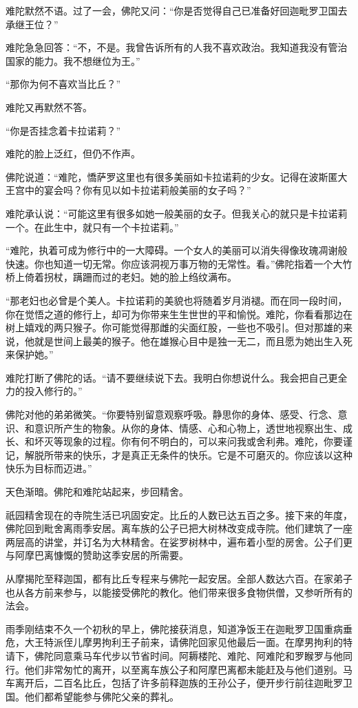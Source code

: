\documentclass[12pt,twoside,openany]{book}
\begin{document}
难陀默然不语。过了一会，佛陀又问：“你是否觉得自己已准备好回迦毗罗卫国去承继王位？”

难陀急急回答：“不，不是。我曾告诉所有的人我不喜欢政治。我知道我没有管治国家的能力。我不想继位为王。”

“那你为何不喜欢当比丘？”

难陀又再默然不答。

“你是否挂念着卡拉诺莉？”

难陀的脸上泛红，但仍不作声。

佛陀说道：“难陀，憍萨罗这里也有很多美丽如卡拉诺莉的少女。记得在波斯匿大王宫中的宴会吗？你有见以如卡拉诺莉般美丽的女子吗？”

难陀承认说：“可能这里有很多如她一般美丽的女子。但我关心的就只是卡拉诺莉一个。在此生中，就只有一个卡拉诺莉。”

“难陀，执着可成为修行中的一大障碍。一个女人的美丽可以消失得像玫瑰凋谢般快速。你也知道一切无常。你应该洞视万事万物的无常性。看。”佛陀指着一个大竹桥上倚着拐杖，蹒跚而过的老妇。她的脸上绉纹满布。

“那老妇也必曾是个美人。卡拉诺莉的美貌也将随着岁月消褪。而在同一段时间，你在觉悟之道的修行上，却可为你带来生生世世的平和愉悦。难陀，你看看那边在树上嬉戏的两只猴子。你可能觉得那雌的尖面红股，一些也不吸引。但对那雄的来说，他就是世间上最美的猴子。他在雄猴心目中是独一无二，而且愿为她出生入死来保护她。”

难陀打断了佛陀的话。“请不要继续说下去。我明白你想说什么。我会把自己更全力的投入修行的。”

佛陀对他的弟弟微笑。“你要特别留意观察呼吸。静思你的身体、感受、行念、意识、和意识所产生的物象。从你的身体、情感、心和心物上，透世地视察出生、成长、和坏灭等现象的过程。你有何不明白的，可以来问我或舍利弗。难陀，你要谨记，解脱所带来的快乐，才是真正无条件的快乐。它是不可磨灭的。你应该以这种快乐为目标而迈进。”

天色渐暗。佛陀和难陀站起来，步回精舍。

祇园精舍现在的寺院生活已巩固安定。比丘的人数已达五百之多。接下来的年度，佛陀回到毗舍离雨季安居。离车族的公子已把大树林改变成寺院。他们建筑了一座两层高的讲堂，并订名为大林精舍。在娑罗树林中，遍布着小型的房舍。公子们更与阿摩巴离慷慨的赞助这季安居的所需要。

从摩揭陀至释迦国，都有比丘专程来与佛陀一起安居。全部人数达六百。在家弟子也从各方前来参与，以能接受佛陀的教化。他们带来很多食物供僧，又参听所有的法会。

雨季刚结束不久一个初秋的早上，佛陀接获消息，知道净饭王在迦毗罗卫国重病垂危，大王特派侄儿摩男拘利王子前来，请佛陀回家见他最后一面。在摩男拘利的特请下，佛陀同意乘马车代步以节省时间。阿耨楼陀、难陀、阿难陀和罗睺罗与他同行。他们非常匆忙的离开，以至离车族公子和阿摩巴离都未能赶及与他们道别。马车离开后，二百名比丘，包括了许多前释迦族的王孙公子，便开步行前往迦毗罗卫国。他们都希望能参与佛陀父亲的葬礼。
\end{document}
